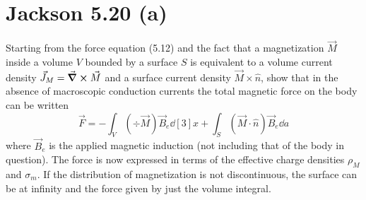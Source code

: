 \documentclass[a4paper,twoside]{article}
\begin{document}
\section{Jackson 5.20 (a)}
Starting from the force equation (5.12) and the fact that a magnetization $ \vec{M} $ inside a volume $ V $ bounded by a surface $ S $ is equivalent to a volume current density $ \vec{J}_M = \curl{ \vec{M}} $ and a surface current density $ \vec{M} \times \hat{n} $, show that in the absence of macroscopic conduction currents the total magnetic force on the body can be written
\begin{equation}
    \vec{F} = - \int_{V} ( \div{ \vec{M}}) \vec{B}_e \dd[3]{x} + \int_S ( \vec{M} \cdot \hat{n}) \vec{B}_e \dd{a}
\end{equation}
where $ \vec{B}_e $ is the applied magnetic induction (not including that of the body in question). The force is now expressed in terms of the effective charge densities $ \rho_{M} $ and $ \sigma_{m} $. If the distribution of magnetization is not discontinuous, the surface can be at infinity and the force given by just the volume integral.
\end{document}

